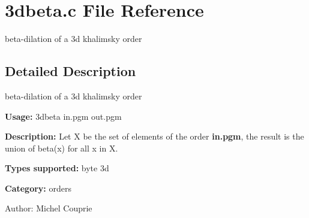\section{3dbeta.c File Reference}
\label{3dbeta_8c}
beta-dilation of a 3d khalimsky order  




\label{_details}
\subsection{Detailed Description}
beta-dilation of a 3d khalimsky order 

{\bf Usage:} 3dbeta in.pgm out.pgm

{\bf Description:} Let X be the set of elements of the order {\bf in.pgm}, the result is the union of beta(x) for all x in X.

{\bf Types supported:} byte 3d

{\bf Category:} orders

\begin{Desc}
\item[Author:]Michel Couprie \end{Desc}
